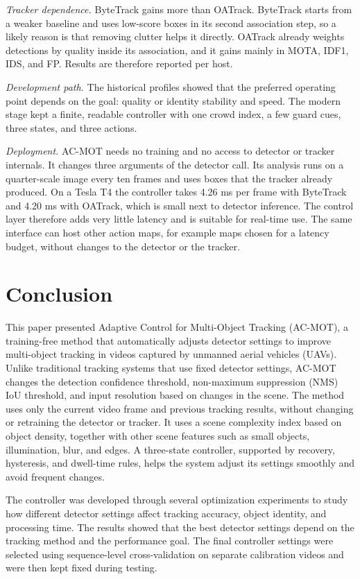\documentclass[pdflatex,sn-mathphys-num,iicol]{sn-jnl}
\begin{document}
\emph{Tracker dependence.} ByteTrack gains more than OATrack. ByteTrack starts
from a weaker baseline and uses low-score boxes in its second association
step, so a likely reason is that removing clutter helps it directly. OATrack
already weights detections by quality inside its association, and it gains
mainly in MOTA, IDF1, IDS, and FP. Results are therefore reported per host.

\emph{Development path.} The historical profiles showed that the preferred
operating point depends on the goal: quality or identity stability and speed.
The modern stage kept a finite, readable controller with one crowd index, a few
guard cues, three states, and three actions.

\emph{Deployment.} AC-MOT needs no training and no access to detector or
tracker internals. It changes three arguments of the detector call. Its
analysis runs on a quarter-scale image every ten frames and uses boxes that
the tracker already produced. On a Tesla T4 the controller takes 4.26 ms per
frame with ByteTrack and 4.20 ms with OATrack, which is small next to detector
inference. The control layer therefore adds very little latency and is
suitable for real-time use. The same interface can host other action maps, for
example maps chosen for a latency budget, without changes to the detector or
the tracker.
\section{Conclusion}\label{sec:conclusion}

This paper presented Adaptive Control for Multi-Object Tracking (AC-MOT), a
training-free method that automatically adjusts detector settings to improve
multi-object tracking in videos captured by unmanned aerial vehicles (UAVs).
Unlike traditional tracking systems that use fixed detector settings, AC-MOT
changes the detection confidence threshold, non-maximum suppression (NMS) IoU
threshold, and input resolution based on changes in the scene. The method uses
only the current video frame and previous tracking results, without changing
or retraining the detector or tracker. It uses a scene complexity index based
on object density, together with other scene features such as small objects,
illumination, blur, and edges. A three-state controller, supported by
recovery, hysteresis, and dwell-time rules, helps the system adjust its
settings smoothly and avoid frequent changes.

The controller was developed through several optimization experiments to study
how different detector settings affect tracking accuracy, object identity, and
processing time. The results showed that the best detector settings depend on
the tracking method and the performance goal. The final controller settings
were selected using sequence-level cross-validation on separate calibration
videos and were then kept fixed during testing.
\end{document}
